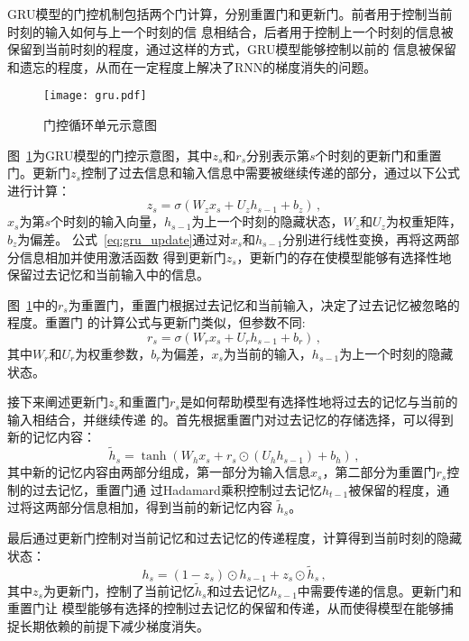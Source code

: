 GRU模型的门控机制包括两个门计算，分别重置门和更新门。前者用于控制当前时刻的输入如何与上一个时刻的信
息相结合，后者用于控制上一个时刻的信息被保留到当前时刻的程度，通过这样的方式，GRU模型能够控制以前的
信息被保留和遗忘的程度，从而在一定程度上解决了RNN的梯度消失的问题。

\begin{figure} [!t]
	\centering
	\texttt{[image: gru.pdf]}
	\caption{门控循环单元示意图}
	\label{fig:gru}
\end{figure}

图~\ref{fig:gru}为GRU模型的门控示意图，其中$z_s$和$r_s$分别表示第$s$个时刻的更新门和重置门。更新门$z_s$控制了过去信息和输入信息中需要被继续传递的部分，通过以下公式进行计算：
\begin{equation}
    z_s = \sigma (W_z x_s + U_z h_{s-1} + b_z) \,,
    \label{eq:gru_update}
\end{equation}
$x_s$为第$s$个时刻的输入向量，$h_{s-1}$为上一个时刻的隐藏状态，$W_z$和$U_z$为权重矩阵，$b_z$为偏差。
公式~\eqref{eq:gru_update}通过对$x_s$和$h_{s-1}$分别进行线性变换，再将这两部分信息相加并使用激活函数
得到更新门$z_s$，更新门的存在使模型能够有选择性地保留过去记忆和当前输入中的信息。

图~\ref{fig:gru}中的$r_s$为重置门，重置门根据过去记忆和当前输入，决定了过去记忆被忽略的程度。重置门
的计算公式与更新门类似，但参数不同:
\begin{equation}
    r_s = \sigma (W_r x_s + U_r h_{s-1} + b_r) \,,
    \label{eq:gru_ret}
\end{equation}
其中$W_r$和$U_r$为权重参数，$b_r$为偏差，$x_s$为当前的输入，$h_{s-1}$为上一个时刻的隐藏状态。

接下来阐述更新门$z_s$和重置门$r_s$是如何帮助模型有选择性地将过去的记忆与当前的输入相结合，并继续传递
的。首先根据重置门对过去记忆的存储选择，可以得到新的记忆内容：
\begin{equation}
    \tilde{h}_s = \tanh (W_h x_s + r_s \odot (U_h h_{s-1}) + b_h) \,,
    \label{eq:gru_cand}
\end{equation}
其中新的记忆内容由两部分组成，第一部分为输入信息$x_s$，第二部分为重置门$r_s$控制的过去记忆，重置门通
过Hadamard乘积控制过去记忆$h_{t-1}$被保留的程度，通过将这两部分信息相加，得到当前的新记忆内容
$\tilde{h}_s$。

最后通过更新门控制对当前记忆和过去记忆的传递程度，计算得到当前时刻的隐藏状态：
\begin{equation}
	h_s = (1-z_s) \odot h_{s-1} + z_s \odot \tilde{h}_s \,,
    \label{eq:gru_h}
\end{equation}
其中$z_s$为更新门，控制了当前记忆$\tilde{h}_s$和过去记忆$h_{s-1}$中需要传递的信息。更新门和重置门让
模型能够有选择的控制过去记忆的保留和传递，从而使得模型在能够捕捉长期依赖的前提下减少梯度消失。


